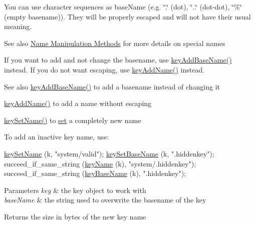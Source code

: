 You can use character sequences as {\ttfamily base\+Name} (e.\+g. {\ttfamily \char`\"{}.\char`\"{}} (dot), {\ttfamily \char`\"{}..\char`\"{}} (dot-\/dot), {\ttfamily \char`\"{}\%\char`\"{}} (empty basename)). They will be properly escaped and will not have their usual meaning.

\begin{DoxySeeAlso}{See also}
\hyperlink{group__keyname}{Name Manipulation Methods} for more details on special names
\end{DoxySeeAlso}
If you want to add and not change the basename, use \hyperlink{group__keyname_gaa942091fc4bd5c2699e49ddc50829524}{key\+Add\+Base\+Name()} instead. If you do not want escaping, use \hyperlink{group__keyname_gaa70593a2c772c4b7bc33423b9b10a270}{key\+Add\+Name()} instead.

\begin{DoxySeeAlso}{See also}
\hyperlink{group__keyname_gaa942091fc4bd5c2699e49ddc50829524}{key\+Add\+Base\+Name()} to add a basename instead of changing it 

\hyperlink{group__keyname_gaa70593a2c772c4b7bc33423b9b10a270}{key\+Add\+Name()} to add a name without escaping 

\hyperlink{group__keyname_ga7699091610e7f3f43d2949514a4b35d9}{key\+Set\+Name()} to \hyperlink{classkdb_1_1Key_a615124f0a2b291e03975b49c233654d7}{set} a completely new name
\end{DoxySeeAlso}
To add an inactive key name, use\+: 
\begin{DoxyCodeInclude}
        \hyperlink{group__keyname_ga7699091610e7f3f43d2949514a4b35d9}{keySetName} (k, \textcolor{stringliteral}{"system/valid"});
        \hyperlink{group__keyname_ga6e804bd453f98c28b0ff51430d1df407}{keySetBaseName} (k, \textcolor{stringliteral}{".hiddenkey"});
        succeed\_if\_same\_string (\hyperlink{group__keyname_ga8e805c726a60da921d3736cda7813513}{keyName} (k), \textcolor{stringliteral}{"system/.hiddenkey"});
        succeed\_if\_same\_string (\hyperlink{group__keyname_gaaff35e7ca8af5560c47e662ceb9465f5}{keyBaseName} (k), \textcolor{stringliteral}{".hiddenkey"});
\end{DoxyCodeInclude}
 
\begin{DoxyParams}{Parameters}
{\em key} & the key object to work with \\
\hline
{\em base\+Name} & the string used to overwrite the basename of the key \\
\hline
\end{DoxyParams}
\begin{DoxyReturn}{Returns}
the size in bytes of the new key name 
\end{DoxyReturn}

